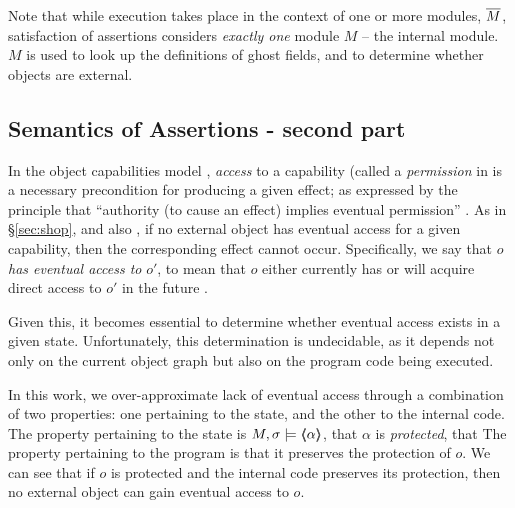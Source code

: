  
Note that while execution takes place in the context of one or more modules, $\overline{M}$, satisfaction of assertions considers \emph{exactly one} module  $M$ -- the internal module. 
{$M$} is used  to look up the definitions of ghost fields, and to %
 determine whether objects are  external.

\subsection{Semantics of Assertions - second part}  

\label{sect:protect}
In the object capabilities model \cite{MillerPhD}, \emph{access} to a capability (called a \emph{permission} in \cite{MillerPhD}
 is a necessary precondition  for producing a given effect;  as expressed by the principle that ``authority (to cause an effect) implies eventual permission'' \cite{permissionAuthority}.
As   in \S \ref{sec:shop}, and also \cite{OOPSLA22}, if no external object has eventual access for a given capability, then the corresponding effect cannot occur.
 Specifically,  we say that $o$ \emph{has eventual access to} $o'$, to mean  that $o$ either currently has or will acquire direct access to $o'$ in the future \cite{permissionAuthority}.



Given this, it becomes essential to determine whether eventual access exists in a given state. 
Unfortunately, this determination is undecidable, as it depends not only on the current object graph but also on the program code being executed.

In this work, we over-approximate lack of eventual access through a combination of two properties: one pertaining to the state, and the other to the internal code. 
The  property pertaining to the state is $M , \sigma \models \langle\!\!\langle \alpha \rangle\!\!\rangle$, \ie that   $\alpha$ is \emph{protected},
\ie that   
The  property pertaining to the program is that it preserves the protection of   $o$.
%
We can see that if $o$ is protected and the internal code preserves its protection, then no external object can gain eventual access to $o$.

